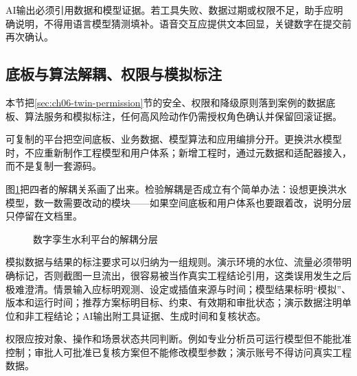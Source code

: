 AI输出必须引用数据和模型证据。若工具失败、数据过期或权限不足，助手应明确说明，不得用语言模型猜测填补。语音交互应提供文本回显，关键数字在提交前再次确认。

\subsection{底板与算法解耦、权限与模拟标注}\label{sec:ch08-twin-permission}

本节把\ref{sec:ch06-twin-permission}节的安全、权限和降级原则落到案例的数据底板、算法服务和模拟标注，任何高风险动作仍需授权角色确认并保留回滚证据。

可复制的平台把空间底板、业务数据、模型算法和应用编排分开。更换洪水模型时，不应重新制作工程模型和用户体系；新增工程时，通过元数据和适配器接入，而不是复制一套源码。

图\ref{fig:twin-decoupling}把四者的解耦关系画了出来。检验解耦是否成立有个简单办法：设想更换洪水模型，数一数需要改动的模块——如果空间底板和用户体系也要跟着改，说明分层只停留在文档里。

\begin{figure}[H]
\centering
{}
\caption{数字孪生水利平台的解耦分层}
\label{fig:twin-decoupling}
\end{figure}

模拟数据与结果的标注要求可以归纳为一组规则。演示环境的水位、流量必须带明确标记，否则截图一旦流出，很容易被当作真实工程结论引用，这类误用发生之后极难澄清。情景输入应标明观测、设定或插值来源与时间；模型结果标明“模拟”、版本和运行时间；推荐方案标明目标、约束、有效期和审批状态；演示数据注明单位和非工程结论；AI输出附工具证据、生成时间和复核状态。

权限应按对象、操作和场景状态共同判断。例如专业分析员可运行模型但不能批准控制；审批人可批准已复核方案但不能修改模型参数；演示账号不得访问真实工程数据。

